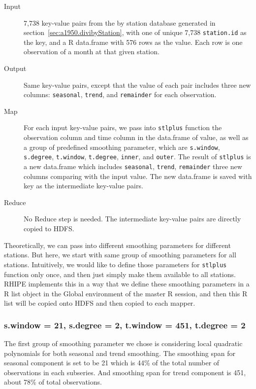 \begin{description}
  \item[Input] 7,738 key-value pairs from the by station database generated in 
  section~\ref{sec:a1950.divibyStation}, with one of unique 7,738 
  \texttt{station.id} as the key, and a R data.frame with 576 rows as the value.
  Each row is one observation of a month at that given station. 
  \item[Output] Same key-value pairs, except that the value of each pair includes
  three new columns: \texttt{seasonal}, \texttt{trend}, and \texttt{remainder} 
  for each observation.
  \item[Map] For each input key-value pairs, we pass into \texttt{stlplus}
  function the observation column and time column in the data.frame of value, as
  well as a group of predefined smoothing parameter, which are \texttt{s.window},
  \texttt{s.degree}, \texttt{t.window}, \texttt{t.degree}, \texttt{inner}, and
  \texttt{outer}. The result of \texttt{stlplus} is a new data.frame which 
  includes \texttt{seasonal}, \texttt{trend}, \texttt{remainder} three new columns
  comparing with the input value. The new data.frame is saved with key as the 
  intermediate key-value pairs.
  \item[Reduce] No Reduce step is needed. The intermediate key-value pairs are 
  directly copied to HDFS.
\end{description}

Theoretically, we can pass into different smoothing parameters for different 
stations. But here, we start with same group of smoothing parameters for all 
stations. Intuitively, we would like to define those parameters for 
\texttt{stlplus} function only once, and then just simply make them available to
all stations. RHIPE implements this in a way that we define these smoothing 
parameters in a R list object in the Global environment of the master R session,
and then this R list will be copied onto HDFS and then copied to each mapper.

\subsubsection{s.window = 21, s.degree = 2, t.window = 451, t.degree = 2}

The first group of smoothing parameter we chose is considering local quadratic 
polynomials for both seasonal and trend smoothing. The smoothing span for seasonal
component is set to be 21 which is 44\% of the total number of observations in 
each subseries. And smoothing span for trend component is 451, about 78\% of total
observations.



